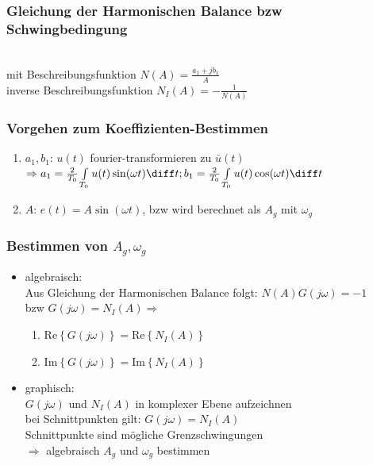 \documentclass[german]{latex4ei/latex4ei_sheet}
\begin{document}
\subsubsection*{Gleichung der Harmonischen Balance bzw Schwingbedingung}
 \\
mit Beschreibungsfunktion $N(A) = \frac{a_1 + j b_1}{A}$ \\
inverse Beschreibungsfunktion $N_I(A) = - \frac{1}{N(A)}$ \\

\subsubsection*{Vorgehen zum Koeffizienten-Bestimmen}

\begin{enumerate}
  \item $a_1, b_1$:  $u(t)$ fourier-transformieren zu $\bar{u}(t)$ \\
    $\Rightarrow a_1 = \frac{2}{T_0} \int\limits_{T_0} u(t) \sin(\omega t) \diff t; \\
                 b_1 = \frac{2}{T_0} \int\limits_{T_0} u(t) \cos(\omega t) \diff t$
  \item $A$: $e(t) = A \sin(\omega t)$, bzw wird berechnet als $A_g$ mit $\omega_g$
\end{enumerate}

\subsubsection*{Bestimmen von $A_g, \omega_g$}
\begin{itemize}
  \item algebraisch: \\
    Aus Gleichung der Harmonischen Balance folgt: $N(A)G(j\omega) = -1$ \\
    bzw $G(j \omega) = N_I(A) \Rightarrow$ \\
    \begin{enumerate}
      \item $\text{Re}\left\{ G(j \omega) \right\} = \text{Re} \left\{ N_I(A) \right\}$ \\
      \item $\text{Im}\left\{ G(j \omega) \right\} = \text{Im} \left\{ N_I(A) \right\}$
    \end{enumerate}
  \item graphisch: \\
    $G(j \omega)$ und $N_I(A)$ in komplexer Ebene aufzeichnen\\
    bei Schnittpunkten gilt: $G(j \omega) = N_I(A)$ \\
    Schnittpunkte sind mögliche Grenzschwingungen \\
    $\Rightarrow$ algebraisch $A_g$ und $\omega_g$ bestimmen
\end{itemize}
\end{document}
